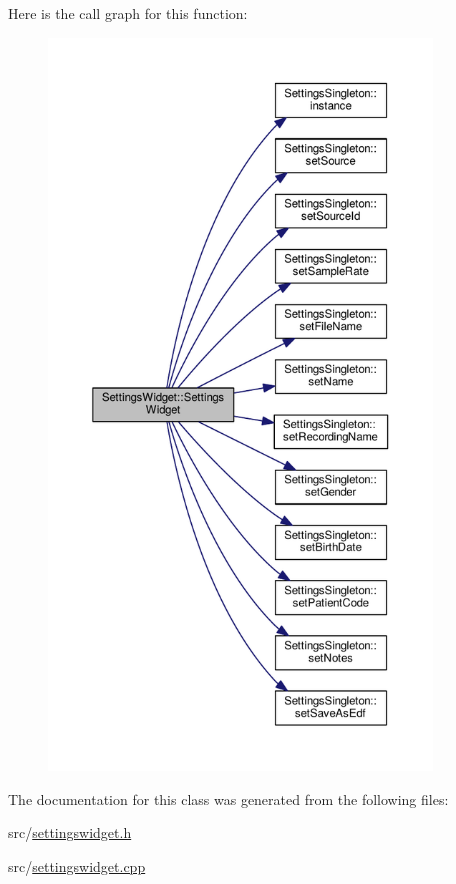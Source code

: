 Here is the call graph for this function\+:\nopagebreak
\begin{figure}[H]
\begin{center}
\leavevmode
\includegraphics[height=550pt]{classSettingsWidget_a339891dcba7d2813bc5d894bff494a78_cgraph}
\end{center}
\end{figure}




The documentation for this class was generated from the following files\+:\begin{DoxyCompactItemize}
\item 
src/\hyperlink{settingswidget_8h}{settingswidget.\+h}\item 
src/\hyperlink{settingswidget_8cpp}{settingswidget.\+cpp}\end{DoxyCompactItemize}
